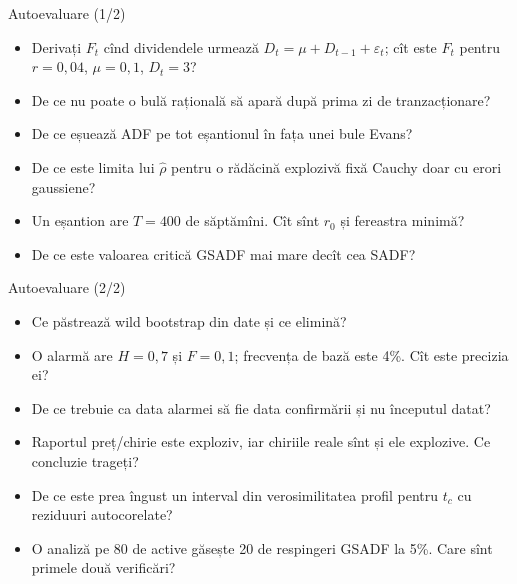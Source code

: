 \begin{frame}{Autoevaluare (1/2)}
\itemsize{\small}
\begin{itemize}
    \item Derivați $F_t$ cînd dividendele urmează $D_t = \mu + D_{t-1} + \varepsilon_t$; cît este $F_t$ pentru $r = 0{,}04$, $\mu = 0{,}1$, $D_t = 3$?
    \item De ce nu poate o bulă rațională să apară după prima zi de tranzacționare?
    \item De ce eșuează ADF pe tot eșantionul în fața unei bule Evans?
    \item De ce este limita lui $\hat\rho$ pentru o rădăcină explozivă fixă Cauchy doar cu erori gaussiene?
    \item Un eșantion are $T = 400$ de săptămîni. Cît sînt $r_0$ și fereastra minimă?
    \item De ce este valoarea critică GSADF mai mare decît cea SADF?
\end{itemize}
\end{frame}

\begin{frame}{Autoevaluare (2/2)}
\itemsize{\small}
\begin{itemize}
    \item Ce păstrează wild bootstrap din date și ce elimină?
    \item O alarmă are $H = 0{,}7$ și $F = 0{,}1$; frecvența de bază este 4\%. Cît este precizia ei?
    \item De ce trebuie ca data alarmei să fie data confirmării și nu începutul datat?
    \item Raportul preț/chirie este exploziv, iar chiriile reale sînt și ele explozive. Ce concluzie trageți?
    \item De ce este prea îngust un interval din verosimilitatea profil pentru $t_c$ cu reziduuri autocorelate?
    \item O analiză pe 80 de active găsește 20 de respingeri GSADF la 5\%. Care sînt primele două verificări?
\end{itemize}
\end{frame}

